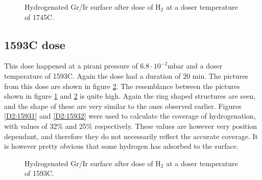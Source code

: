 \begin{figure}[H]
\caption{Hydrogenated Gr/Ir surface after dose of H$_2$ at a doser temperature of 1745\degree C.}
\label{D2:1745}
\end{figure}

\subsection{1593\degree C dose}

This dose happened at a pirani pressure of $6.8 \cdot 10^{-2}$mbar and a doser temperature of 1593\degree C. Again the dose had a duration of 20 min. The pictures from this dose are shown in figure \ref{D2:1593}. The resemblance between the pictures shown in figure \ref{D2:1745} and \ref{D2:1593} is quite high. Again the ring shaped structures are seen, and the shape of these are very similar to the ones observed earlier. Figures \ref{D2:15931} and \ref{D2:15932} were used to calculate the coverage of hydrogenation, with values of 32\% and 25\% respectively. These values are however very position dependant, and therefore they do not necessarily reflect the accurate coverage. It is however pretty obvious that some hydrogen has adsorbed to the surface.

\begin{figure}[H]
\caption{Hydrogenated Gr/Ir surface after dose of H$_2$ at a doser temperature of 1593\degree C.}
\label{D2:1593}
\end{figure}

